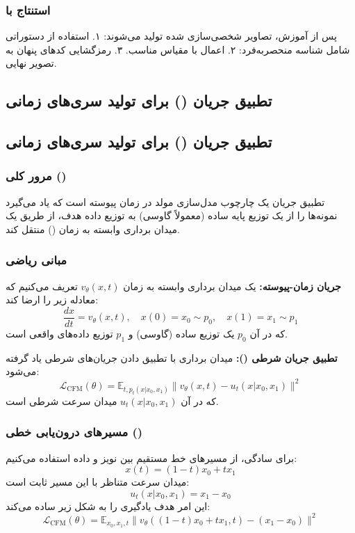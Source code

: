 \subsubsection{استنتاج با }
پس از آموزش، تصاویر شخصی‌سازی شده تولید می‌شوند:
۱. استفاده از دستوراتی شامل شناسه منحصر‌به‌فرد: 
۲. اعمال  با مقیاس مناسب.
۳. رمزگشایی کدهای پنهان به تصویر نهایی.

\subsection{تطبیق جریان () برای تولید سری‌های زمانی}


\subsection{تطبیق جریان () برای تولید سری‌های زمانی}

\subsubsection{مرور کلی ()}
تطبیق جریان یک چارچوب مدل‌سازی مولد در زمان پیوسته است که یاد می‌گیرد نمونه‌ها را از یک توزیع پایه ساده (معمولاً گاوسی) به توزیع داده هدف، از طریق یک میدان برداری وابسته به زمان () منتقل کند.

\subsubsection{مبانی ریاضی}
\textbf{جریان زمان-پیوسته:} یک میدان برداری وابسته به زمان $v_\theta(x, t)$ تعریف می‌کنیم که معادله زیر را ارضا کند:
\[ \frac{dx}{dt} = v_\theta(x, t), \quad x(0) = x_0 \sim p_0, \quad x(1) = x_1 \sim p_1 \]
که در آن $p_0$ یک توزیع ساده (گاوسی) و $p_1$ توزیع داده‌های واقعی است.



\textbf{تطبیق جریان شرطی ():} میدان برداری با تطبیق دادن جریان‌های شرطی یاد گرفته می‌شود:
\[ \mathcal{L}_\text{CFM}(\theta) = \mathbb{E}_{t, p_t(x|x_0,x_1)} \| v_\theta(x, t) - u_t(x|x_0,x_1) \|^2 \]
که در آن $u_t(x|x_0,x_1)$ میدان سرعت شرطی است.

\subsubsection{مسیرهای درون‌یابی خطی ()}
برای سادگی، از مسیرهای خط مستقیم بین نویز و داده استفاده می‌کنیم:
\[ x(t) = (1-t) x_0 + t x_1 \]
میدان سرعت متناظر با این مسیر ثابت است:
\[ u_t(x|x_0,x_1) = x_1 - x_0 \]
این امر هدف یادگیری را به شکل زیر ساده می‌کند:
\[ \mathcal{L}_\text{CFM}(\theta) = \mathbb{E}_{x_0,x_1,t} \| v_\theta((1-t)x_0 + t x_1, t) - (x_1 - x_0) \|^2 \]

